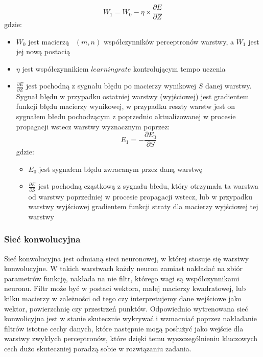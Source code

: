 \documentclass{article}
\begin{document}
\begin{equation}
    W_1 = W_0 - \eta \times \frac{\partial E}{\partial Z}
\end{equation}
gdzie:
\begin{itemize}
    \item $W_0$ jest macierzą ~$(m, n)$ współczynników perceptronów warstwy, a $W_1$ jest jej nową postacią
    \item $\eta$ jest współczynnikiem $learning rate$ kontrolującym tempo uczenia
    \item $\frac{\partial E}{\partial Z}$ jest pochodną z sygnału błędu po 
    macierzy wynikowej $S$ danej warstwy. Sygnał błędu w przypadku ostatniej warstwy (wyjściowej) jest
    gradientem funkcji błędu macierzy wynikowej, w przypadku reszty warstw 
    jest on sygnałem błedu pochodzącym z poprzednio aktualizowanej w procesie propagacji wstecz warstwy
    wyznacznym poprzez:
    \begin{equation}
        E_1 = -\frac{\partial E_0}{\partial S}
    \end{equation}
    gdzie:
    \begin{itemize}
        \item $E_0$ jest sygnałem błędu zwracanym przez daną warstwę
        \item $\frac{\partial E}{\partial S}$ jest pochodną cząstkową z sygnału błedu, 
        który otrzymała ta warstwa od warstwy poprzedniej w procesie propagacji wstecz, lub w przypadku warstwy
        wyjściowej gradientem funkcji straty dla macierzy wyjściowej tej warstwy
    \end{itemize}
\end{itemize}

\subsubsection{Sieć konwolucyjna}
Sieć konwolucyjna jest odmianą sieci neuronowej, 
w której stosuje się warstwy konwolucyjne. W takich 
warstwach każdy neuron zamiast nakładać na zbiór parametrów 
funkcję, nakłada na nie filtr, którego wagi są współczynnikami 
neuronu. Filtr może być w postaci wektora, małej macierzy kwadratowej, 
lub kilku macierzy w zależności od tego czy interpretujemy dane wejściowe 
jako wektor, powierzchnię czy przestrzeń punktów. Odpowiednio wytrenowana 
sieć konwolicyjna jest w stanie skutecznie wykrywać i wzmacniać poprzez 
nakładanie filtrów istotne cechy danych, które następnie mogą posłużyć 
jako wejście dla warstwy zwykłych perceptronów, które dzięki temu wyszczególnieniu 
kluczowych cech dużo skuteczniej poradzą sobie w rozwiązaniu zadania.
\end{document}
